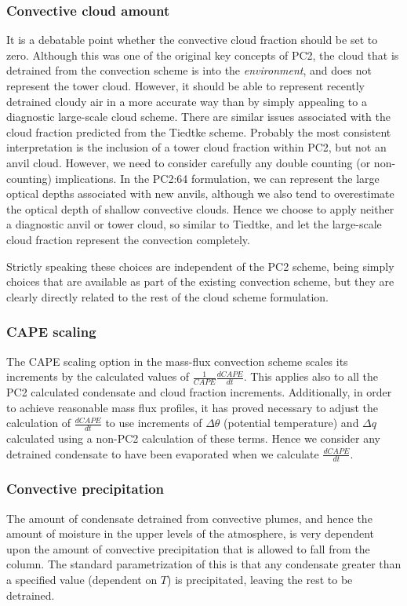 \documentclass{UMDP_article}
\begin{document}
\subsubsection{Convective cloud amount}
It is a debatable point whether the convective cloud fraction should
be set to zero. Although this was one of the original key concepts of
PC2, the cloud that is detrained from the convection scheme is into
the \textit{environment}, and does not represent the tower cloud. However,
it should be able to represent recently detrained cloudy air in a more
accurate way than by simply appealing to a diagnostic large-scale cloud scheme.
There are similar issues associated with the cloud fraction predicted
from the Tiedtke scheme. Probably the most consistent interpretation
is the inclusion of a tower cloud fraction within PC2, but not an
anvil cloud. However, we need to consider carefully any double
counting (or non-counting) implications. In the PC2:64 formulation,
we can represent the large optical depths associated
with new anvils, although we also tend to overestimate the optical
depth of shallow convective clouds.
Hence we choose to apply neither a diagnostic anvil or tower cloud,
so similar to Tiedtke, and let the large-scale cloud fraction represent
the convection completely.

Strictly speaking these choices are independent of the PC2 scheme,
being simply choices that are available as part of the existing convection
scheme, but they are clearly directly related to the rest of the
cloud scheme formulation.

\subsubsection{CAPE scaling}
The CAPE scaling option in the mass-flux convection scheme scales its
increments by the calculated values of $\frac{1}{CAPE} \frac{dCAPE}{dt}$.
This applies
also to all the PC2 calculated condensate and cloud fraction increments.
Additionally, in order to achieve reasonable mass flux profiles,
it has proved necessary to adjust the calculation of
$\frac{dCAPE}{dt}$ to use increments of
$\Delta \theta$ (potential
temperature) and $\Delta q$ calculated using a non-PC2 calculation
of these terms. Hence we consider any detrained condensate to have been
evaporated when we calculate $\frac{dCAPE}{dt}$.

\subsubsection{Convective precipitation}
The amount of condensate detrained from convective plumes, and hence
the amount of moisture in the upper levels of the atmosphere, is very
dependent upon the amount of convective precipitation that is allowed
to fall from the column. The standard parametrization of this is that
any condensate greater than a specified value (dependent on $T$)
is precipitated, leaving the rest to be detrained.
\end{document}
